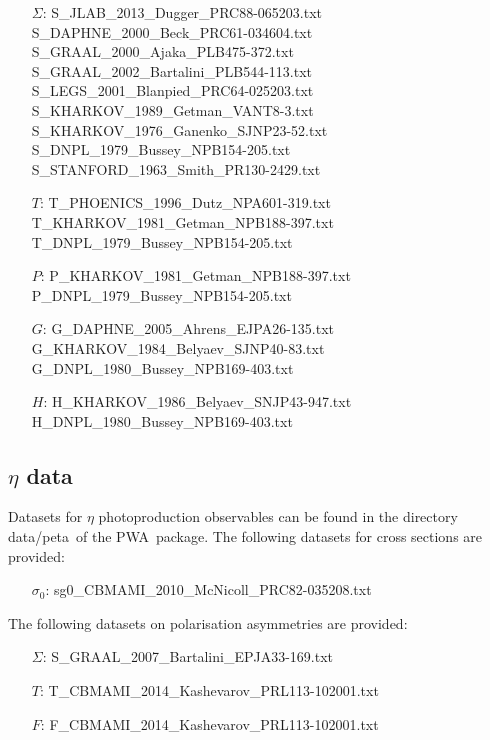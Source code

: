 \documentclass[a4paper,10pt]{article}
\def\PWA{\ttfamily PWA\rmfamily\ }
\def\tt{\ttfamily}
\def\rm{\rmfamily}
\begin{document}
\begin{itemize}
\item[$\Sigma$:\:]
\tt S\_JLAB\_2013\_Dugger\_PRC88-065203.txt\rm \\
\tt S\_DAPHNE\_2000\_Beck\_PRC61-034604.txt\rm \\
\tt S\_GRAAL\_2000\_Ajaka\_PLB475-372.txt\rm \\
\tt S\_GRAAL\_2002\_Bartalini\_PLB544-113.txt\rm \\
\tt S\_LEGS\_2001\_Blanpied\_PRC64-025203.txt\rm \\
\tt S\_KHARKOV\_1989\_Getman\_VANT8-3.txt\rm \\
\tt S\_KHARKOV\_1976\_Ganenko\_SJNP23-52.txt\rm \\
\tt S\_DNPL\_1979\_Bussey\_NPB154-205.txt\rm \\
\tt S\_STANFORD\_1963\_Smith\_PR130-2429.txt\rm

\item[$T$:\:]
\tt T\_PHOENICS\_1996\_Dutz\_NPA601-319.txt\rm \\
\tt T\_KHARKOV\_1981\_Getman\_NPB188-397.txt\rm \\
\tt T\_DNPL\_1979\_Bussey\_NPB154-205.txt\rm

\item[$P$:\:]
\tt P\_KHARKOV\_1981\_Getman\_NPB188-397.txt\rm \\
\tt P\_DNPL\_1979\_Bussey\_NPB154-205.txt\rm

\item[$G$:\:]
\tt G\_DAPHNE\_2005\_Ahrens\_EJPA26-135.txt\rm \\
\tt G\_KHARKOV\_1984\_Belyaev\_SJNP40-83.txt\rm \\
\tt G\_DNPL\_1980\_Bussey\_NPB169-403.txt\rm

\item[$H$:\:]
\tt H\_KHARKOV\_1986\_Belyaev\_SNJP43-947.txt\rm \\
\tt H\_DNPL\_1980\_Bussey\_NPB169-403.txt\rm
\end{itemize}

\subsection{$\eta$ data}
Datasets for $\eta$ photoproduction observables can be found in the directory 
\tt data/peta\rm\ of the \PWA package. The following datasets for cross sections are provided:
\begin{itemize}
\item[$\sigma_0$:\:]
\tt sg0\_CBMAMI\_2010\_McNicoll\_PRC82-035208.txt\rm
\end{itemize}
The following datasets on polarisation asymmetries are provided:
\begin{itemize}
\item[$\Sigma$:\:]
\tt S\_GRAAL\_2007\_Bartalini\_EPJA33-169.txt\rm

\item[$T$:\:]
\tt T\_CBMAMI\_2014\_Kashevarov\_PRL113-102001.txt\rm

\item[$F$:\:]
\tt F\_CBMAMI\_2014\_Kashevarov\_PRL113-102001.txt\rm
\end{itemize}
\end{document}
